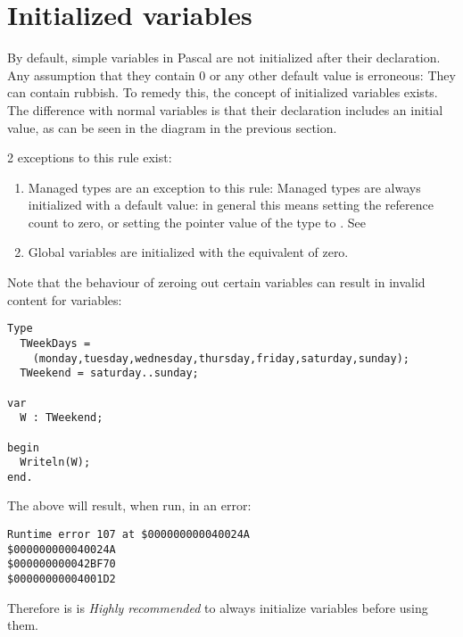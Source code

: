 \section{Initialized variables}
\label{se:initializedvars}
By default, simple variables in Pascal are not initialized after their declaration.
Any assumption that they contain 0 or any other default value is erroneous:
They can contain rubbish. To remedy this, the concept of initialized variables 
exists. The difference with normal variables is that their declaration includes 
an initial value, as can be seen in the diagram in the previous section.

\begin{remark}
2 exceptions to this rule exist:
\begin{enumerate}
\item Managed types are an exception to this rule: Managed types are always
initialized with a default value: in general this means setting the reference 
count to zero, or setting the pointer value of the type to . 
See 
\item Global variables are initialized with the equivalent of zero. 
\end{enumerate}
\end{remark}

Note that the behaviour of zeroing out certain variables can result in invalid 
content for variables:
\begin{verbatim}
Type
  TWeekDays = 
    (monday,tuesday,wednesday,thursday,friday,saturday,sunday);
  TWeekend = saturday..sunday;

var
  W : TWeekend;

begin
  Writeln(W);
end.
\end{verbatim}
The above will result, when run, in an error:
\begin{verbatim}
Runtime error 107 at $000000000040024A
$000000000040024A
$000000000042BF70
$00000000004001D2
\end{verbatim}
Therefore is is {\em Highly recommended} to always initialize variables
before using them.

